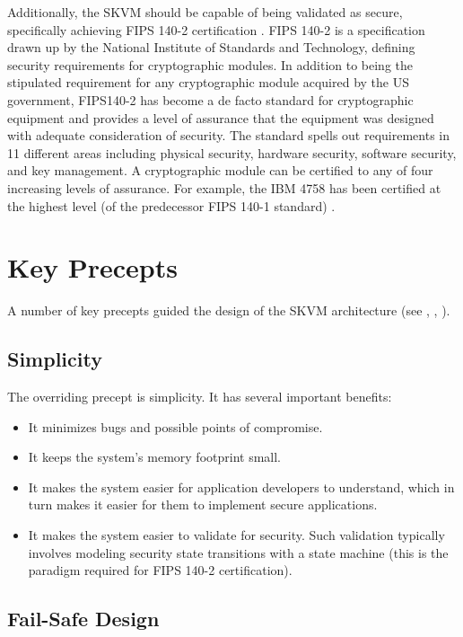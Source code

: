 \documentclass{llncs}
\begin{document}
Additionally, the SKVM should be capable of being validated as
secure, specifically achieving FIPS 140-2 certification \cite{fips}.
FIPS 140-2 is a specification drawn up by the National Institute
of Standards and Technology, defining security requirements for
cryptographic modules. In addition to being the stipulated requirement
for any cryptographic module acquired by the US government, FIPS140-2
has become a de facto standard for cryptographic equipment and
provides a level of assurance that the equipment was designed with
adequate consideration of security. The standard spells out
requirements in 11 different areas including physical security,
hardware security, software security, and key management. A
cryptographic module can be certified to any of four increasing
levels of assurance. For example, the IBM 4758 has been certified
at the highest level (of the predecessor FIPS 140-1 standard) \cite{dyer}.

\section{Key Precepts}

A number of key precepts guided the design of the SKVM architecture
(see \cite{schneier}, \cite{schneier96}, \cite{anderson}).

\subsection{Simplicity}

The overriding precept is simplicity. It has several important
benefits:
\begin{itemize}
  \item It minimizes bugs and possible points of compromise.
  \item It keeps the system's memory footprint small.
  \item It makes the system easier for application developers to
  understand, which in turn makes it easier for them to
  implement secure applications.
  \item It makes the system easier to validate for security. Such validation typically
  involves modeling security state transitions with a state
  machine (this is the paradigm required for FIPS 140-2 certification).
\end{itemize}

\subsection{Fail-Safe Design}
\end{document}
